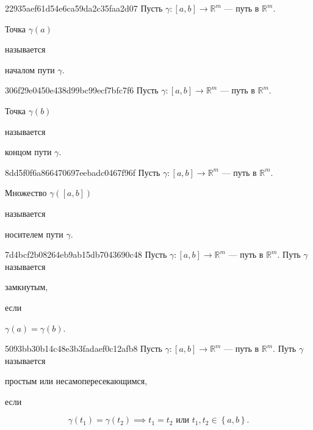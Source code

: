 \begin{note}{22935aef61d54e6ca59da2c35faa2d07}
    Пусть \({ \gamma : [a, b] \to \mathbb R^{m} }\) --- путь в \({ \mathbb R^{m} }\).
    \begin{icloze}{2}Точка \({ \gamma(a) }\)\end{icloze} называется \begin{icloze}{1}началом пути \({ \gamma }\).\end{icloze}
\end{note}

\begin{note}{306f29e0450e438d99bc99ecf7bfc7f6}
    Пусть \({ \gamma : [a, b] \to \mathbb R^{m} }\) --- путь в \({ \mathbb R^{m} }\).
    \begin{icloze}{2}Точка \({ \gamma(b) }\)\end{icloze} называется \begin{icloze}{1}концом пути \({ \gamma }\).\end{icloze}
\end{note}

\begin{note}{8dd5f0f6a866470697eebadc0467f96f}
    Пусть \({ \gamma : [a, b] \to \mathbb R^{m} }\) --- путь в \({ \mathbb R^{m} }\).
    \begin{icloze}{1}Множество \({ \gamma([a, b]) }\)\end{icloze} называется \begin{icloze}{2}носителем пути \({ \gamma }\).\end{icloze}
\end{note}

\begin{note}{7d4bcf2b08264eb9ab15db7043690c48}
    Пусть \({ \gamma : [a, b] \to \mathbb R^{m} }\) --- путь в \({ \mathbb R^{m} }\).
    Путь \({ \gamma }\) называется \begin{icloze}{2}замкнутым,\end{icloze} если \begin{icloze}{1}\({ \gamma(a) = \gamma(b) }\).\end{icloze}
\end{note}

\begin{note}{5093bb30b14c48e3b3fadaef0c12afb8}
    Пусть \({ \gamma : [a, b] \to \mathbb R^{m} }\) --- путь в \({ \mathbb R^{m} }\).
    Путь \({ \gamma }\) называется \begin{icloze}{2}простым или несамопересекающимся,\end{icloze} если
    \begin{icloze}{1}
        \[
            \gamma(t_1) = \gamma(t_2) \implies t_1 = t_2 \text{ или } t_1, t_2 \in \left\{ a, b \right\}.
        \]
    \end{icloze}
\end{note}

